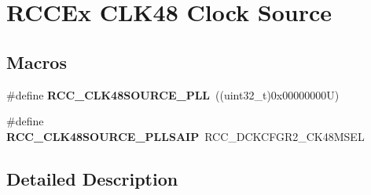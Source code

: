 \hypertarget{group___r_c_c_ex___c_l_k48___clock___source}{}\section{R\+C\+C\+Ex C\+L\+K48 Clock Source}
\label{group___r_c_c_ex___c_l_k48___clock___source}
\subsection*{Macros}
\begin{DoxyCompactItemize}
\item 
\mbox{\label{group___r_c_c_ex___c_l_k48___clock___source_gaf4cf9f569dde5acd749d49e19f64796a}} 
\#define {\bfseries R\+C\+C\+\_\+\+C\+L\+K48\+S\+O\+U\+R\+C\+E\+\_\+\+P\+LL}~((uint32\+\_\+t)0x00000000\+U)
\item 
\mbox{\label{group___r_c_c_ex___c_l_k48___clock___source_ga3e0b8965f1c67887486e9201c0384cbc}} 
\#define {\bfseries R\+C\+C\+\_\+\+C\+L\+K48\+S\+O\+U\+R\+C\+E\+\_\+\+P\+L\+L\+S\+A\+IP}~R\+C\+C\+\_\+\+D\+C\+K\+C\+F\+G\+R2\+\_\+\+C\+K48\+M\+S\+EL
\end{DoxyCompactItemize}


\subsection{Detailed Description}
